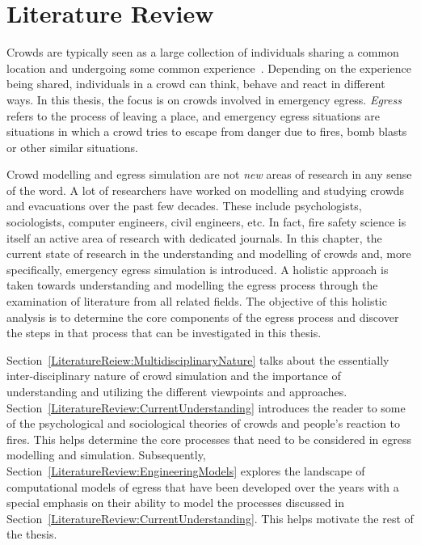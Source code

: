 
\chapter{Literature Review}
\label{chapter:LiteratureReview}

Crowds are typically seen as a large collection of individuals sharing a common location and undergoing some common experience~\cite{Aveni:1997wq}. Depending on the experience being shared, individuals in a crowd can think, behave and react in different ways. In this thesis, the focus is on crowds involved in emergency egress. \emph{Egress} refers to the process of leaving a place, and emergency egress situations are situations in which a crowd tries to escape from danger due to fires, bomb blasts or other similar situations.

Crowd modelling and egress simulation are not \emph{new} areas of research in any sense of the word. A lot of researchers have worked on modelling and studying crowds and evacuations over the past few decades. These include psychologists, sociologists, computer engineers, civil engineers, etc. In fact, fire safety science is itself an active area of research with dedicated journals. In this chapter, the current state of research in the understanding and modelling of crowds and, more specifically, emergency egress simulation is introduced. A holistic approach is taken towards understanding and modelling the egress process through the examination of literature from all related fields. The objective of this holistic analysis is to determine the core components of the egress process and discover the steps in that process that can be investigated in this thesis.

 Section~\ref{LiteratureReiew:MultidisciplinaryNature} talks about the essentially inter-disciplinary nature of crowd simulation and the importance of understanding and utilizing the different viewpoints and approaches. Section~\ref{LiteratureReview:CurrentUnderstanding} introduces the reader to some of the psychological and sociological theories of crowds and people's reaction to fires. This helps determine the core processes that need to be considered in egress modelling and simulation. Subsequently, Section~\ref{LiteratureReview:EngineeringModels} explores the landscape of computational models of egress that have been developed over the years with a special emphasis on their ability to model the processes discussed in Section~\ref{LiteratureReview:CurrentUnderstanding}. This helps motivate the rest of the thesis.

